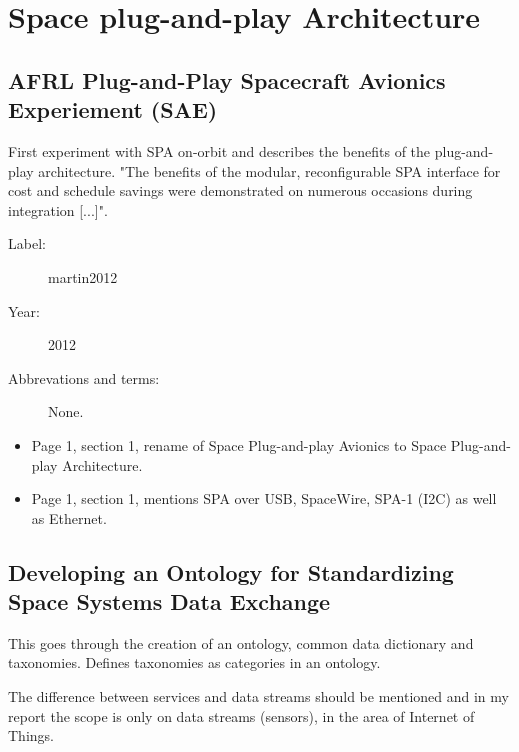 \chapter{Space plug-and-play Architecture}

\section{AFRL Plug-and-Play Spacecraft Avionics Experiement (SAE)}

First experiment with SPA on-orbit and describes the benefits of the
plug-and-play architecture. "The benefits of the modular, reconfigurable SPA
interface for cost and schedule savings were demonstrated on numerous occasions
during integration [...]".

\begin{description}
    \item[Label:] martin2012 \cite{martin2012}
    \item[Year:] 2012
    \item[Abbrevations and terms:] None.
\end{description}

\begin{itemize}
    \item Page 1, section 1, rename of Space Plug-and-play Avionics to Space
        Plug-and-play Architecture.
    \item Page 1, section 1, mentions SPA over USB, SpaceWire, SPA-1 (I2C) as
        well as Ethernet.
\end{itemize}

\section{Developing an Ontology for Standardizing Space Systems Data Exchange}

This goes through the creation of an ontology, common data dictionary and
taxonomies. Defines taxonomies as categories in an ontology.

The difference between services and data streams should be mentioned and in my
report the scope is only on data streams (sensors), in the area of Internet of
Things.

